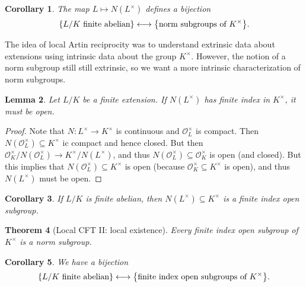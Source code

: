 \documentclass[leqno, openany]{memoir}
\newtheorem{thm}{Theorem}[section]
\newtheorem{cor}[thm]{Corollary}
\newtheorem{lem}[thm]{Lemma}
\theoremstyle{definition}
\theoremstyle{remark}
\theoremstyle{plain}
\theoremstyle{definition}
\theoremstyle{remark}
\newcommand{\mc}[1]{\mathcal{#1}}
\begin{document}
\begin{cor} The map $L \mapsto N(L^{\times})$ defines a bijection \[ \qty{L/K\
\text{finite abelian}} \longleftrightarrow \qty{\text{norm subgroups of }
K^{\times}}. \] \end{cor}

The idea of local Artin reciprocity was to understand extrinsic data about
extensions using intrinsic data about the group $K^{\times}$. However, the
notion of a norm subgroup still still extrinsic, so we want a more intrinsic
characterization of norm subgroups.

\begin{lem} Let $L/K$ be a finite extension. If $N(L^{\times})$ has finite
index in $K^{\times}$, it must be open.  \end{lem}

\begin{proof} Note that $N \colon L^{\times} \to K^{\times}$ is continuous and
    $\mc{O}_L^{\times}$ is compact. Then $N(\mc{O}_L^{\times}) \subseteq
    K^{\times}$ ic compact and hence closed. But then $\mc{O}_K^{\times} /
    N(\mc{O}_L^{\times}) \to K^{\times}/N(L^{\times})$, and thus
    $N(\mc{O}_L^{\times}) \subseteq \mc{O}_K^{\times}$ is open (and closed).
    But this implies that $N(\mc{O}_L^{\times}) \subseteq K^{\times}$ is open
    (because $\mc{O}_K^{\times} \subseteq K^{\times}$ is open), and thus
    $N(L^{\times})$ must be open.  \end{proof}

\begin{cor} If $L/K$ is finite abelian, then $N(L^{\times}) \subseteq
K^{\times}$ is a finite index open subgroup.  \end{cor}

\begin{thm}[Local CFT II: local existence] Every finite index open subgroup of
$K^{\times}$ is a norm subgroup.  \end{thm}

\begin{cor} We have a bijection \[ \qty{L/K\ \text{finite abelian}}
\longleftrightarrow \qty{\text{finite index open subgroups of } K^{\times}}. \]
\end{cor}
\end{document}
